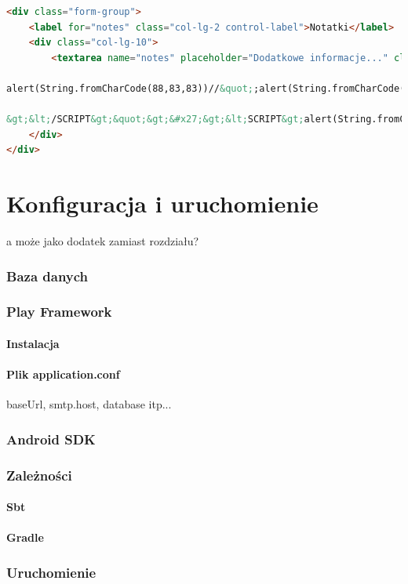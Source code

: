 \documentclass[11pt]{aghdpl}
\begin{document}
\begin{lstlisting}[language=HTML]
<div class="form-group">
    <label for="notes" class="col-lg-2 control-label">Notatki</label>
    <div class="col-lg-10">
        <textarea name="notes" placeholder="Dodatkowe informacje..." class="form-control" rows="5">&#x27;;alert(String.fromCharCode(88,83,83))//&#x27;;alert(String.fromCharCode(88,83,83))//&quot;;

alert(String.fromCharCode(88,83,83))//&quot;;alert(String.fromCharCode(88,83,83))//--

&gt;&lt;/SCRIPT&gt;&quot;&gt;&#x27;&gt;&lt;SCRIPT&gt;alert(String.fromCharCode(88,83,83))&lt;/SCRIPT&gt;</textarea>
    </div>
</div>
\end{lstlisting}


\chapter{Konfiguracja i uruchomienie}
\label{cha:konfiguracja_i_uruchomienie}
a może jako dodatek zamiast rozdziału?

\subsection{Baza danych}
\subsection{Play Framework}
\subsubsection{Instalacja}
\subsubsection{Plik application.conf}
baseUrl, smtp.host, database itp...
\subsection{Android SDK}
\subsection{Zależności}
\subsubsection{Sbt}
\subsubsection{Gradle}
\subsection{Uruchomienie}

% 
% 



\end{document}
